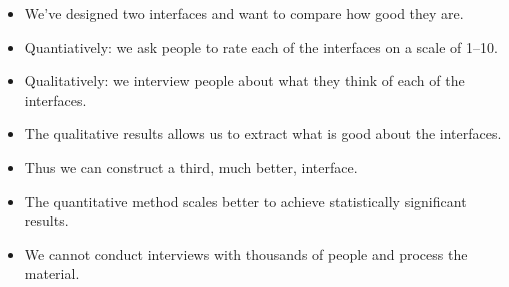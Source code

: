 \begin{frame}
  \begin{example}
    \begin{itemize}
      \item We've designed two interfaces and want to compare how good they 
        are.
      \item Quantiatively: we ask people to rate each of the interfaces on a 
        scale of 1--10.
      \item Qualitatively: we interview people about what they think of each of 
        the interfaces.
    \end{itemize}
  \end{example}
\end{frame}

\begin{frame}
  \begin{remark}
    \begin{itemize}
      \item The qualitative results allows us to extract what is good about the 
        interfaces.
      \item Thus we can construct a third, much better, interface.

        \pause

      \item The quantitative method scales better to achieve statistically 
        significant results.
      \item We cannot conduct interviews with thousands of people and process 
        the material.
    \end{itemize}
  \end{remark}
\end{frame}




\begin{frame}[allowframebreaks]
  \small
  \printbibliography
\end{frame}

